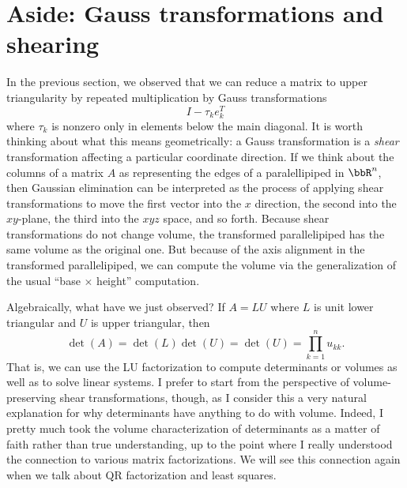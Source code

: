 \section{Aside: Gauss transformations and shearing}

In the previous section, we observed that we can reduce a matrix
to upper triangularity by repeated multiplication by Gauss
transformations
\[
  I-\tau_k e_k^T
\]
where $\tau_k$ is nonzero only in elements below the main diagonal.
It is worth thinking about what this means geometrically: a Gauss
transformation is a {\em shear} transformation affecting a particular
coordinate direction.  If we think about the columns of a matrix $A$
as representing the edges of a paralellipiped in $\bbR^n$, then
Gaussian elimination can be interpreted as the process of applying
shear transformations to move the first vector into the $x$ direction,
the second into the $xy$-plane, the third into the $xyz$ space, and
so forth.  Because shear transformations do not change volume, the
transformed parallelipiped has the same volume as the original one.
But because of the axis alignment in the transformed parallelipiped,
we can compute the volume via the generalization of the
usual ``base $\times$ height'' computation.

Algebraically, what have we just observed?  If $A = LU$ where $L$
is unit lower triangular and $U$ is upper triangular, then
\[
  \det(A) = \det(L) \det(U) = \det(U) = \prod_{k=1}^n u_{kk}.
\]
That is, we can use the LU factorization to compute determinants
or volumes as well as to solve linear systems.  I prefer to start
from the perspective of volume-preserving shear transformations,
though, as I consider this a very natural explanation for why
determinants have anything to do with volume.  Indeed, I pretty much
took the volume characterization of determinants as a matter of faith
rather than true understanding, up to the point where I really
understood the connection to various matrix factorizations.  We will
see this connection again when we talk about QR factorization and
least squares.
